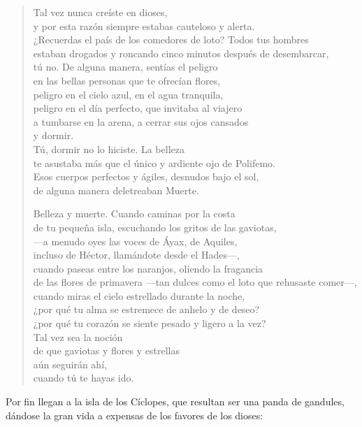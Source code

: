 \documentclass[11pt,a4paper]{article}
\begin{document}
\begin{verse}
Tal vez nunca creíste en dioses,\\
y por esta razón siempre estabas cauteloso y alerta.\\
¿Recuerdas el país de los comedores de loto? Todos tus hombres\\
estaban drogados y roncando cinco minutos después de desembarcar,\\
tú no. De alguna manera, sentías el peligro\\
en las bellas personas que te ofrecían flores,\\
peligro en el cielo azul, en el agua tranquila,\\
peligro en el día perfecto, que invitaba al viajero\\
a tumbarse en la arena, a cerrar sus ojos cansados\\
y dormir.\\
Tú, dormir no lo hiciste. La belleza\\
te asustaba más que el único y ardiente ojo de Polifemo.\\
Esos cuerpos perfectos y ágiles, desnudos bajo el sol,\\
de alguna manera deletreaban Muerte.

Belleza y muerte. Cuando caminas por la costa\\
de tu pequeña isla, escuchando los gritos de las gaviotas,\\
---a menudo oyes las voces de Áyax, de Aquiles,\\
incluso de Héctor, llamándote desde el Hades---,\\
cuando paseas entre los naranjos, oliendo la fragancia\\
de las flores de primavera ---tan dulces como el loto que rehusaste comer---,\\
cuando miras el cielo estrellado durante la noche,\\
¿por qué tu alma se estremece de anhelo y de deseo?\\
¿por qué tu corazón se siente pesado y ligero a la vez?\\
Tal vez sea la noción\\
de que gaviotas y flores y estrellas\\
aún seguirán ahí,\\
cuando tú te hayas ido.
\end{verse}

Por fin llegan a la isla de los Cíclopes, que resultan ser una panda de gandules, dándose la gran vida a expensas de los favores de los dioses:
\end{document}
